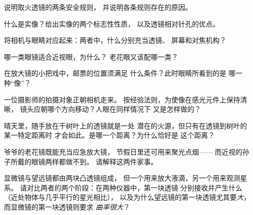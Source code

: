 \begin{exercise}[$\star$]\label{exo:g8:lenses-images:4}
说明取火透镜的两条安全规则，
并说明各条规则存在的原因。
\end{exercise}

\begin{exercise}[$\star$]\label{exo:g8:lenses-images:5}
什么是实像？给出实像的两个标志性性质，
以及透镜相对针孔的优点。
\end{exercise}

\begin{exercise}[$\star$]\label{exo:g8:lenses-images:6}
将相机与眼睛对应起来：两者中，什么分别充当透镜、
屏幕和对焦机构？
\end{exercise}

\begin{exercise}[$\star$]\label{exo:g8:lenses-images:7}
哪一类眼镜适合近视眼，为什么？
老花眼又该配哪一类？
\end{exercise}

\begin{exercise}[$\star$]\label{exo:g8:lenses-images:8}
在放大镜的小把戏中，邮票的位置须满足
什么条件？此时眼睛所看到的是
哪一种“像”？
\end{exercise}

\begin{exercise}[$\star\star$]\label{exo:g8:lenses-images:9}
一位摄影师的拍摄对象正朝相机走来。
按经验法则，为使像在感光元件上保持清晰，
镜头应朝哪个方向移动？人眼在同样情况下
又是怎样做的？
\end{exercise}

\begin{exercise}[$\star\star$]\label{exo:g8:lenses-images:10}
晴天里，随手放在干树叶上的透镜就是一处
潜在的火源，但只有在透镜到树叶的某一特定距离时
才会如此。是哪一个距离？为什么恰好是
这个距离？
\end{exercise}

\begin{exercise}[$\star\star$]\label{exo:g8:lenses-images:11}
爷爷的老花镜既能充当应急放大镜，
节假日里还可用来聚光点烟——
而近视的孙子所戴的眼镜两样都做不到。
请解释这两件家事。
\end{exercise}

\begin{exercise}[$\star\star\star$]\label{exo:g8:lenses-images:12}
显微镜与望远镜都由两块凸透镜组成，
但一个用来放大液滴，另一个用来观测星系。
请对比两者的两个阶段：在两种仪器中，第一块透镜
分别接收并产生什么（近处物体与几乎平行的星光相比），
以及为什么望远镜的第一块透镜尤其要\emph{大}，
而显微镜的第一块透镜则要求
\emph{曲率很大}？
\end{exercise}

